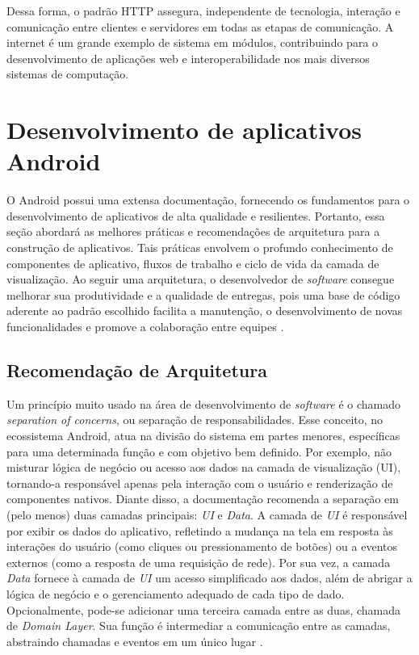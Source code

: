 Dessa forma, o padrão HTTP assegura, independente de tecnologia, interação e comunicação entre clientes e servidores em todas as 
etapas de comunicação. A internet é um grande exemplo de sistema em módulos, contribuindo para o desenvolvimento de aplicações web e 
interoperabilidade nos mais diversos sistemas de computação.

\section{Desenvolvimento de aplicativos Android}

O Android possui uma extensa documentação, fornecendo os fundamentos para o desenvolvimento de 
aplicativos de alta qualidade e resilientes. Portanto, essa seção abordará as melhores práticas e recomendações
de arquitetura para a construção de aplicativos. Tais práticas envolvem o profundo
conhecimento de componentes de aplicativo, fluxos de trabalho e ciclo de vida da camada de visualização. Ao seguir uma arquitetura, 
o desenvolvedor de \textit{software} consegue melhorar sua produtividade e a qualidade de entregas, pois uma base de código aderente ao 
padrão escolhido facilita a manutenção, o desenvolvimento de novas funcionalidades e promove a colaboração entre equipes \cite{google-developers-guideline}.

\subsection{Recomendação de Arquitetura}

Um princípio muito usado na área de desenvolvimento de \textit{software} é o chamado \textit{separation of concerns}, ou separação de responsabilidades. Esse conceito, no ecossistema Android,
atua na divisão do sistema em partes menores, específicas para uma determinada função e com objetivo bem definido. Por exemplo, não misturar lógica de 
negócio ou acesso aos dados na camada de visualização (UI), tornando-a  responsável apenas pela interação com o usuário e renderização de componentes nativos. Diante disso, a documentação recomenda a separação em (pelo menos)
duas camadas principais: \textit{UI} e \textit{Data}. A camada de \textit{UI} é responsável por exibir os dados do aplicativo, refletindo a mudança na tela em resposta às
interações do usuário (como cliques ou pressionamento de botões) ou a eventos externos (como a resposta de uma requisição de rede). Por sua vez, a camada \textit{Data} fornece à camada de \textit{UI} 
um acesso simplificado aos dados, além de abrigar a lógica de negócio e o gerenciamento adequado de cada tipo de dado. Opcionalmente, pode-se adicionar uma terceira camada entre as duas, chamada de \textit{Domain Layer}.
Sua função é intermediar a comunicação entre as camadas, abstraindo chamadas e eventos em um único lugar \cite{google-developers-guideline}.

